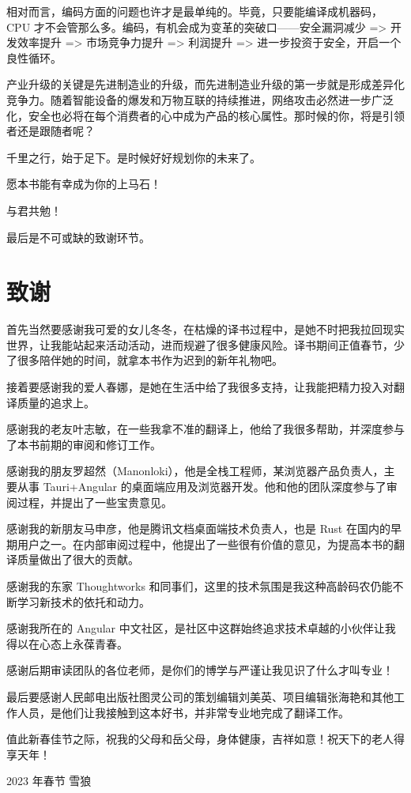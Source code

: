 相对而言，编码方面的问题也许才是最单纯的。毕竟，只要能编译成机器码，CPU 才不会管那么多。编码，有机会成为变革的突破口——安全漏洞减少 => 开发效率提升 => 市场竞争力提升 => 利润提升 => 进一步投资于安全，开启一个良性循环。

产业升级的关键是先进制造业的升级，而先进制造业升级的第一步就是形成差异化竞争力。随着智能设备的爆发和万物互联的持续推进，网络攻击必然进一步广泛化，安全也必将在每个消费者的心中成为产品的核心属性。那时候的你，将是引领者还是跟随者呢？

千里之行，始于足下。是时候好好规划你的未来了。

愿本书能有幸成为你的上马石！

与君共勉！

最后是不可或缺的致谢环节。

\section{致谢}

首先当然要感谢我可爱的女儿冬冬，在枯燥的译书过程中，是她不时把我拉回现实世界，让我能站起来活动活动，进而规避了很多健康风险。译书期间正值春节，少了很多陪伴她的时间，就拿本书作为迟到的新年礼物吧。

接着要感谢我的爱人春娜，是她在生活中给了我很多支持，让我能把精力投入对翻译质量的追求上。

感谢我的老友叶志敏，在一些我拿不准的翻译上，他给了我很多帮助，并深度参与了本书前期的审阅和修订工作。

感谢我的朋友罗超然（Manonloki），他是全栈工程师，某浏览器产品负责人，主要从事 Tauri+Angular 的桌面端应用及浏览器开发。他和他的团队深度参与了审阅过程，并提出了一些宝贵意见。

感谢我的新朋友马申彦，他是腾讯文档桌面端技术负责人，也是 Rust 在国内的早期用户之一。在内部审阅过程中，他提出了一些很有价值的意见，为提高本书的翻译质量做出了很大的贡献。

感谢我的东家 Thoughtworks 和同事们，这里的技术氛围是我这种高龄码农仍能不断学习新技术的依托和动力。

感谢我所在的 Angular 中文社区，是社区中这群始终追求技术卓越的小伙伴让我得以在心态上永葆青春。

感谢后期审读团队的各位老师，是你们的博学与严谨让我见识了什么才叫专业！

最后要感谢人民邮电出版社图灵公司的策划编辑刘美英、项目编辑张海艳和其他工作人员，是他们让我接触到这本好书，并非常专业地完成了翻译工作。

值此新春佳节之际，祝我的父母和岳父母，身体健康，吉祥如意！祝天下的老人得享天年！

\begin{myEpigraph}{2023 年春节}
雪狼
\end{myEpigraph}

